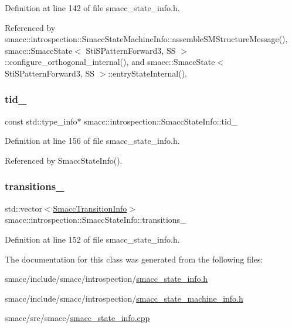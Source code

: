 Definition at line 142 of file smacc\+\_\+state\+\_\+info.\+h.



Referenced by smacc\+::introspection\+::\+Smacc\+State\+Machine\+Info\+::assemble\+S\+M\+Structure\+Message(), smacc\+::\+Smacc\+State$<$ Sti\+S\+Pattern\+Forward3, S\+S $>$\+::configure\+\_\+orthogonal\+\_\+internal(), and smacc\+::\+Smacc\+State$<$ Sti\+S\+Pattern\+Forward3, S\+S $>$\+::entry\+State\+Internal().

\mbox{\label{classsmacc_1_1introspection_1_1SmaccStateInfo_a37d0d0bce171b57b8d3a39f44ab45248}} 
\subsubsection{\texorpdfstring{tid\+\_\+}{tid\_}}
{\footnotesize\ttfamily const std\+::type\+\_\+info$\ast$ smacc\+::introspection\+::\+Smacc\+State\+Info\+::tid\+\_\+}



Definition at line 156 of file smacc\+\_\+state\+\_\+info.\+h.



Referenced by Smacc\+State\+Info().

\mbox{\label{classsmacc_1_1introspection_1_1SmaccStateInfo_ae8b5d8e409e377ef9a88d92fb31a8446}} 
\subsubsection{\texorpdfstring{transitions\+\_\+}{transitions\_}}
{\footnotesize\ttfamily std\+::vector$<$\hyperlink{structsmacc_1_1introspection_1_1SmaccTransitionInfo}{Smacc\+Transition\+Info}$>$ smacc\+::introspection\+::\+Smacc\+State\+Info\+::transitions\+\_\+}



Definition at line 152 of file smacc\+\_\+state\+\_\+info.\+h.



The documentation for this class was generated from the following files\+:\begin{DoxyCompactItemize}
\item 
smacc/include/smacc/introspection/\hyperlink{smacc__state__info_8h}{smacc\+\_\+state\+\_\+info.\+h}\item 
smacc/include/smacc/introspection/\hyperlink{smacc__state__machine__info_8h}{smacc\+\_\+state\+\_\+machine\+\_\+info.\+h}\item 
smacc/src/smacc/\hyperlink{smacc__state__info_8cpp}{smacc\+\_\+state\+\_\+info.\+cpp}\end{DoxyCompactItemize}
